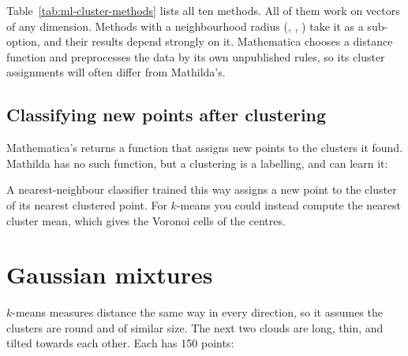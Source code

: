 Table~\ref{tab:ml-cluster-methods} lists all ten methods. All of them work on
vectors of any dimension. Methods with a neighbourhood radius (,
, ) take it as a sub-option,
and their results depend strongly on it. Mathematica chooses a distance function
and preprocesses the data by its own unpublished rules, so its cluster
assignments will often differ from Mathilda's.

\subsection{Classifying new points after clustering}
\label{ssec:ml-clusterclassify}

Mathematica's  returns a function that assigns new points
to the clusters it found. Mathilda has no such function, but a clustering is a
labelling, and  can learn it:

\begin{codepairs}
\end{codepairs}

A nearest-neighbour classifier trained this way assigns a new point to the
cluster of its nearest clustered point. For \(k\)-means you could instead compute
the nearest cluster mean, which gives the Voronoi cells of the centres.

\section{Gaussian mixtures}
\label{sec:ml-mixtures}

\(k\)-means measures distance the same way in every direction, so it assumes the
clusters are round and of similar size. The next two clouds are long, thin, and
tilted towards each other. Each has 150 points:

\begin{codepairs}
\end{codepairs}

